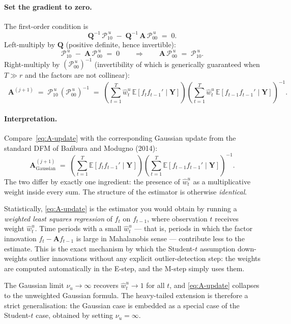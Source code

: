 \documentclass[11pt, a4paper, oneside]{article}
\newcommand{\mY}{\mathbf{Y}}
\newcommand{\mA}{\mathbf{A}}
\newcommand{\mQ}{\mathbf{Q}}
\begin{document}
\paragraph{Set the gradient to zero.}
The first-order condition is
\[
\mQ^{-1}\,\mathcal{P}_{10}^{\,u} \;-\; \mQ^{-1}\,\mA\,\mathcal{P}_{00}^{\,u} \;=\; 0.
\]
Left-multiply by $\mQ$ (positive definite, hence invertible):
\[
\mathcal{P}_{10}^{\,u} \;-\; \mA\,\mathcal{P}_{00}^{\,u} \;=\; 0
\qquad\Longrightarrow\qquad
\mA\, \mathcal{P}_{00}^{\,u} \;=\; \mathcal{P}_{10}^{\,u}.
\]
Right-multiply by $(\mathcal{P}_{00}^{\,u})^{-1}$ (invertibility of
which is generically guaranteed when $T \gg r$ and the factors are
not collinear):
\begin{equation}
\boxed{\;\;
\mA^{(j+1)} \;=\; \mathcal{P}_{10}^{\,u}\, (\mathcal{P}_{00}^{\,u})^{-1}
\;=\; \left(\sum_{t=1}^{T} \hat{w}^u_t\, \mathbb{E}[f_t f_{t-1}' \mid \mY]\right)
\left(\sum_{t=1}^{T} \hat{w}^u_t\, \mathbb{E}[f_{t-1} f_{t-1}' \mid \mY]\right)^{-1}.
\;\;}
\label{eq:A-update}
\end{equation}

\paragraph{Interpretation.}
Compare~\eqref{eq:A-update} with the corresponding Gaussian update
from the standard DFM of Bańbura and Modugno (2014):
\[
\mA^{(j+1)}_{\text{Gaussian}} \;=\; \left(\sum_{t=1}^{T} \mathbb{E}[f_t f_{t-1}' \mid \mY]\right)
\left(\sum_{t=1}^{T} \mathbb{E}[f_{t-1} f_{t-1}' \mid \mY]\right)^{-1}.
\]
The two differ by exactly one ingredient: the presence of
$\hat{w}^u_t$ as a multiplicative weight inside every sum. The
structure of the estimator is otherwise \emph{identical}.

Statistically, \eqref{eq:A-update} is the estimator you would obtain
by running a \emph{weighted least squares regression} of $f_t$ on
$f_{t-1}$, where observation $t$ receives weight $\hat{w}^u_t$. Time
periods with a small $\hat{w}^u_t$ — that is, periods in which the
factor innovation $f_t - \mA f_{t-1}$ is large in Mahalanobis sense —
contribute less to the estimate. This is the exact mechanism by which
the Student-$t$ assumption down-weights outlier innovations without
any explicit outlier-detection step: the weights are computed
automatically in the E-step, and the M-step simply uses them.

The Gaussian limit $\nu_u \to \infty$ recovers
$\hat{w}^u_t \to 1$ for all $t$, and \eqref{eq:A-update} collapses to
the unweighted Gaussian formula. The heavy-tailed extension is
therefore a strict generalisation: the Gaussian case is embedded as
a special case of the Student-$t$ case, obtained by setting
$\nu_u = \infty$.
\end{document}

